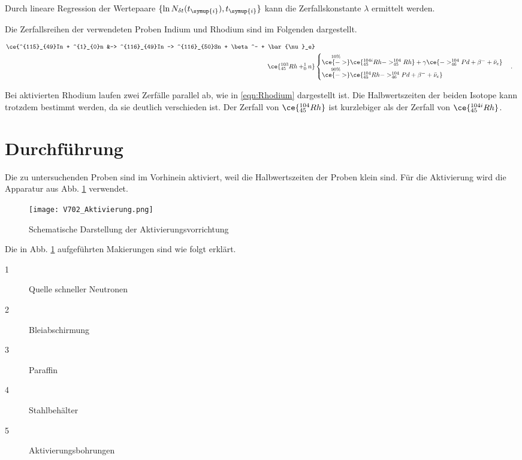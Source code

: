 Durch lineare Regression der Wertepaare $\{\ln{N_{\delta t}(t_{\symup{i}}}), t_{\symup{i}}\}$
kann die Zerfallskonstante $\lambda$ ermittelt werden.

Die Zerfallsreihen der verwendeten Proben Indium und Rhodium sind im Folgenden
dargestellt.

\begin{align}
  \label{eqn:Indium}
  \ce{^{115}_{49}In + ^{1}_{0}n &-> ^{116}_{49}In -> ^{116}_{50}Sn + \beta^- + \bar{\nu}_e} \\
  \label{eqn:Rhodium}
  \ce{^{103}_{45}Rh + ^{1}_{0}n}&
  \begin{cases}
  \overset{10\%}{\ce{->}} \ce{^{104i}_{45}Rh
  -> ^{104}_{45}Rh} + \gamma \ce{-> ^{104}_{46}Pd + \beta^{-} + \bar{\nu}_e} \\
  \overset{90\%}{\ce{->}} \ce{^{104}_{45}Rh -> ^{104}_{46}Pd + \beta^{-} + \bar{\nu}_e}
  \end{cases}.
\end{align}

Bei aktivierten Rhodium laufen zwei Zerfälle parallel ab, wie in \eqref{eqn:Rhodium}
dargestellt ist. Die Halbwertszeiten der beiden Isotope kann trotzdem bestimmt werden,
da sie deutlich verschieden ist. Der Zerfall von $\ce{^{104}_{45}Rh}$ ist
kurzlebiger als der Zerfall von $\ce{^{104i}_{45}Rh}$.

\newpage

\section{Durchführung}

Die zu untersuchenden Proben sind im Vorhinein aktiviert, weil die Halbwertszeiten
der Proben klein sind. Für die Aktivierung
wird die Apparatur aus Abb. \ref{fig:Aktivierung} verwendet.

\begin{figure}
  \centering
  \texttt{[image: V702\_Aktivierung.png]}
  \caption{Schematische Darstellung der Aktivierungsvorrichtung\cite{anleitung01}}
  \label{fig:Aktivierung}
\end{figure}

Die in Abb. \ref{fig:Aktivierung} aufgeführten Makierungen sind wie folgt erklärt.

\begin{description}
  \item[1] Quelle schneller Neutronen
  \item[2] Bleiabschirmung
  \item[3] Paraffin
  \item[4] Stahlbehälter
  \item[5] Aktivierungsbohrungen
\end{description}

